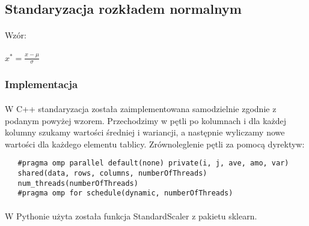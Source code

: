 \documentclass[a4paper,11pt]{article}
\begin{document}
\paragraph{}
\newpage

\subsection{Standaryzacja rozkładem normalnym} 
\paragraph{} Wzór:
\paragraph{}$x^*=\frac{x-\mu}{\sigma}$
\subsubsection{Implementacja} 
\paragraph{}W C++ standaryzacja została zaimplementowana samodzielnie zgodnie z podanym powyżej wzorem. Przechodzimy w pętli po kolumnach i dla każdej kolumny szukamy wartości średniej i wariancji, a następnie wyliczamy nowe wartości dla każdego elementu tablicy. Zrównoleglenie pętli za pomocą dyrektyw:
\begin{lstlisting}
   #pragma omp parallel default(none) private(i, j, ave, amo, var) 
   shared(data, rows, columns, numberOfThreads)
   num_threads(numberOfThreads)
   #pragma omp for schedule(dynamic, numberOfThreads)
\end{lstlisting}

\paragraph{}W Pythonie użyta została funkcja StandardScaler z pakietu sklearn.
\end{document}
